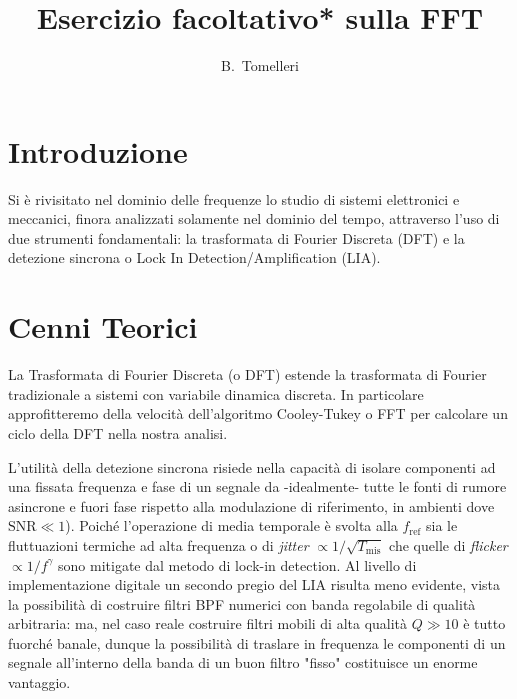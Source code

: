\documentclass{article}[a4paper, oneside, 11pt]
\title{Esercizio facoltativo* sulla FFT}
\author{B.~Tomelleri \thanksdf}
\begin{document}
\maketitle

\section{Introduzione}
Si è rivisitato nel dominio delle frequenze lo studio di sistemi elettronici
e meccanici, finora analizzati solamente nel dominio del tempo, attraverso l'uso
di due strumenti fondamentali: la trasformata di Fourier Discreta (DFT) e la
detezione sincrona o Lock In Detection/Amplification (LIA).

\section{Cenni Teorici}
La Trasformata di Fourier Discreta (o DFT) estende la trasformata di Fourier
tradizionale a sistemi con variabile dinamica discreta. In particolare
approfitteremo della velocità dell'algoritmo Cooley-Tukey \cite{FFT} o FFT
per calcolare un ciclo della DFT nella nostra analisi.

L'utilità della detezione sincrona risiede nella capacità di isolare
componenti ad una fissata frequenza e fase di un segnale da -idealmente-
tutte le fonti di rumore asincrone e fuori fase rispetto alla modulazione
di riferimento, in ambienti dove $\text{SNR} \ll 1$).
Poiché l'operazione di media temporale è svolta alla $f_{\text{ref}}$ sia
le fluttuazioni termiche ad alta frequenza o di \emph{jitter}
$\propto 1/\sqrt{T_{\text{mis}}}$ che quelle di \emph{flicker}
$\propto 1/f^\gamma$ sono mitigate dal metodo di lock-in detection.
Al livello di implementazione digitale un secondo pregio del LIA risulta meno
evidente, vista la possibilità di costruire filtri BPF numerici con banda
regolabile di qualità arbitraria: ma, nel caso reale costruire
filtri mobili di alta qualità $Q \gg 10$ è tutto fuorché banale, dunque la
possibilità di traslare in frequenza le componenti di un segnale all'interno
della banda di un buon filtro "fisso" costituisce un enorme vantaggio.
\end{document}
